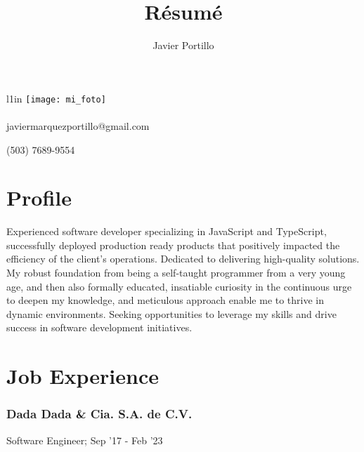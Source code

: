 \documentclass[letterpaper]{article}
\makeatletter
\renewcommand{\maketitle}{
	\begin{center}
		{\huge\bfseries\theauthor}

		\vspace{.5em}

     javiermarquezportillo@gmail.com \faEnvelope

		\vspace{.5em}

    (503) 7689-9554 \faPhone \hspace{.1em} \faWhatsapp
	\end{center}
}
\makeatother
\begin{document}
\begin{wrapfigure}{l}{1in}
  \centering
  \texttt{[image: mi\_foto]}
\end{wrapfigure}

\paragraph{}
\vspace*{-\parskip}


\title{R\'esum\'e}

\author{Javier Portillo}

\maketitle

\section{Profile}

Experienced software developer specializing in JavaScript and TypeScript, successfully deployed production ready products that positively impacted the efficiency of the client's operations.
Dedicated to delivering high-quality solutions.
My robust foundation from being a self-taught programmer from a very young age, and then also formally educated, insatiable curiosity in the continuous urge to deepen my knowledge, and meticulous approach enable me to thrive in dynamic environments.
Seeking opportunities to leverage my skills and drive success in software development initiatives.

\section{Job Experience}

\subsubsection{Dada Dada \& Cia. S.A. de C.V.}

Software Engineer; Sep '17 - Feb '23
\end{document}
